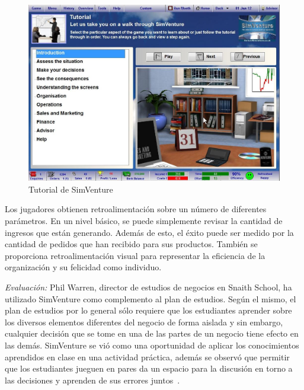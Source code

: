 \begin{figure}[h!]
	\centering 
	\includegraphics[scale=0.5]{tics/images/simventure-tutorial.jpg}
	\caption{Tutorial de SimVenture}
	\label{fig:simventure_tutorial}
\end{figure}

Los jugadores obtienen retroalimentación sobre un número de diferentes
parámetros. En un nivel básico, se puede simplemente revisar la cantidad de
ingresos que están generando. Además de esto, el éxito puede ser medido por la
cantidad de pedidos que han recibido para sus productos. También se proporciona
retroalimentación visual para representar la eficiencia de la organización y su
felicidad como individuo.

\emph{Evaluación: } Phil Warren, director de estudios de negocios en Snaith
School, ha utilizado SimVenture como complemento al plan de estudios. Según el
mismo, el plan de estudios por lo general sólo requiere que los estudiantes
aprender sobre los diversos elementos diferentes del negocio de forma aislada y
sin embargo, cualquier decisión que se tome en una de las partes de un negocio
tiene efecto en las demás. SimVenture se vió como una oportunidad de aplicar los
conocimientos aprendidos en clase en una actividad práctica, además se observó
que permitir que los estudiantes jueguen en pares da un espacio para la
discusión en torno a las decisiones y aprenden de sus errores
juntos~\cite{education:games}.
